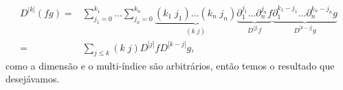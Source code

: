 \documentclass{article}
\begin{document}
\begin{enumerate}
		$$
		\begin{aligned}
		D^{|k|} (fg)
		= & \sum_{j_{1}=0}^{k_{1}} \dots \sum_{j_{n}=0}^{k_{n}} \underbrace{ (k_{1} \; j_{1}) \dots (k_{n} \; j_{n}) }_{(k \; j)} \underbrace{ \partial_{1}^{j_{1}} \dots \partial_{n}^{j_{n}}f }_{D^{|j|}f} \underbrace{ \partial_{1}^{k_{1}-j_{1}} \dots \partial_{n}^{k_{n}-j_{n}}g }_{D^{|k-j|}g} \\
		= & \sum_{j \leq k} (k \; j) D^{|j|}f D^{|k-j|}g,
		\end{aligned}
		$$
		como a dimensão e o multi-índice são arbitrários, então temos o resultado que desejávamos.
		
	\end{enumerate}
	
	
\end{document}
